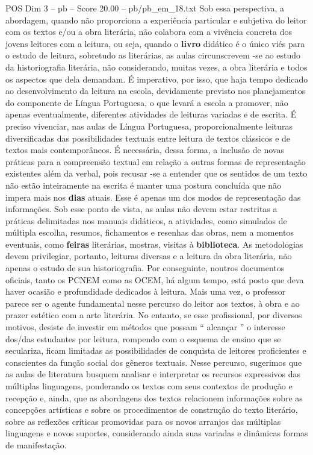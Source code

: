 \begin{textsample}{POS Dim 3 – pb – Score 20.00 – pb/pb\_em\_18.txt}
Sob essa perspectiva, a abordagem, quando não proporciona a experiência particular e subjetiva do leitor com os textos e/ou a obra literária, não colabora com a vivência concreta dos jovens leitores com a leitura, ou seja, quando o \textbf{livro} didático é o único viés para o estudo de leitura, sobretudo as literárias, as aulas circunscrevem -se ao estudo da historiografia literária, não considerando, muitas vezes, a obra literária e todos os aspectos que dela demandam.
É imperativo, por isso, que haja tempo dedicado ao desenvolvimento da leitura na escola, devidamente previsto nos planejamentos do componente de Língua Portuguesa, o que levará a escola a promover, não apenas eventualmente, diferentes atividades de leituras variadas e de escrita.
É preciso vivenciar, nas aulas de Língua Portuguesa, proporcionalmente leituras diversificadas das possibilidades textuais entre leitura de textos clássicos e de textos mais contemporâneos.
É necessária, dessa forma, a inclusão de novas práticas para a compreensão textual em relação a outras formas de representação existentes além da verbal, pois recusar -se a entender que os sentidos de um texto não estão inteiramente na escrita é manter uma postura concluída que não impera mais nos \textbf{dias} atuais.
Esse é apenas um dos modos de representação das informações.
Sob esse ponto de vista, as aulas não devem estar restritas a práticas delimitadas nos manuais didáticos, a atividades, como simulados de múltipla escolha, resumos, fichamentos e resenhas das obras, nem a momentos eventuais, como \textbf{feiras} literárias, mostras, visitas à \textbf{biblioteca}.
As metodologias devem privilegiar, portanto, leituras diversas e a leitura da obra literária, não apenas o estudo de sua historiografia.
Por conseguinte, noutros documentos oficiais, tanto os PCNEM como as OCEM, há algum tempo, está posto que deva haver ocasião e profundidade dedicados à leitura.
Mais uma vez, o professor parece ser o agente fundamental nesse percurso do leitor aos textos, à obra e ao prazer estético com a arte literária.
No entanto, se esse profissional, por diversos motivos, desiste de investir em métodos que possam “ alcançar ” o interesse dos/das estudantes por leitura, rompendo com o esquema de ensino que se seculariza, ficam limitadas as possibilidades de conquista de leitores proficientes e conscientes da função social dos gêneros textuais.
Nesse percurso, sugerimos que as aulas de literatura busquem analisar e interpretar os recursos expressivos das múltiplas linguagens, ponderando os textos com seus contextos de produção e recepção e, ainda, que as abordagens dos textos relacionem informações sobre as concepções artísticas e sobre os procedimentos de construção do texto literário, sobre as reflexões críticas promovidas para os novos arranjos das múltiplas linguagens e novos suportes, considerando ainda suas variadas e dinâmicas formas de manifestação.

\end{textsample}
